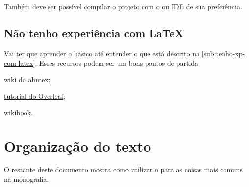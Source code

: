 Também deve ser possível compilar o projeto com o  ou IDE de sua preferência.

\subsection{Não tenho experiência com \LaTeX{}}

Vai ter que aprender o básico até entender o que está descrito na \autoref{sub:tenho-xp-com-latex}. Esses recursos podem ser um bons pontos de partida:

\begin{alineas}
	\item \href{https://github.com/abntex/abntex2/wiki}{wiki do abntex};

	\item \href{https://www.overleaf.com/learn/latex/Learn_LaTeX_in_30_minutes}{tutorial do Overleaf};

	\item \href{https://en.wikibooks.org/wiki/LaTeX}{wikibook}.
\end{alineas}

\section{Organização do texto}

O restante deste documento mostra como utilizar o \template para as coisas mais comuns na monografia.

